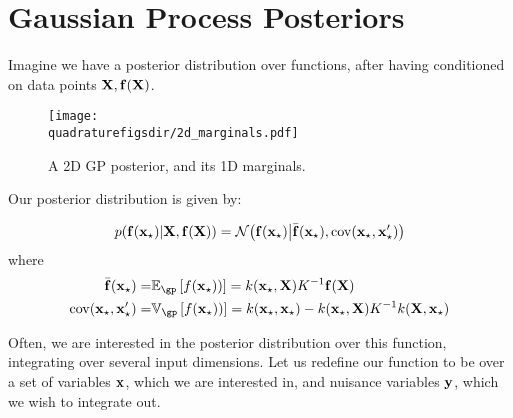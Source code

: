 



\section{Gaussian Process Posteriors}

Imagine we have a \gp{} posterior distribution over functions, after having conditioned on data points ${\mathbf{X}, {\bf{f}}(\mathbf{X})}$.

\begin{figure}[h!]
\centering
\texttt{[image: \\quadraturefigsdir/2d\_marginals.pdf]}
\caption[A 2D \sgp{} posterior, and its 1D marginals]
{A 2D GP posterior, and its 1D marginals.}
\label{fig:marginals}
\end{figure}

Our posterior distribution is given by:

\begin{align}
p({\bf{f}}({\bf{x}}_\star)|\mathbf{X}, {\bf{f}}(\mathbf{X})) = \mathcal{N}\!\left({\bf{f}}({\bf{x}}_\star) \middle| \bar{{\bf{f}}}({\bf{x}}_\star),\operatorname{cov}({\bf{x}}_\star,{\bf{x}}_\star')\right)
\end{align} 
where
\begin{align}
\mf(\vx\st) = & \expect_\gp \left[ f(\vx\st))\right] = k(\vx\st, \vX) K^{-1} \vf(\vX) \\
\cov(\vx\st, \vx\st') = & \variance_\gp \left[ f(\vx\st))\right] = k(\vx\st,\vx\st) - k(\vx\st, \vX) K^{-1} k(\vX, \vx\st)
\end{align} 

Often, we are interested in the posterior distribution over this function, integrating over several input dimensions.  Let us redefine our function to be over a set of variables ${\bf{x}}$, which we are interested in, and nuisance variables ${\bf{y}}$, which we wish to integrate out.


